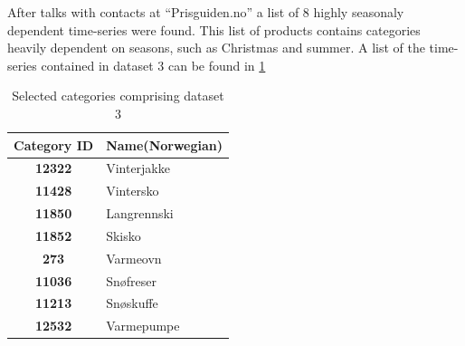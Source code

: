 After talks with contacts at ``Prisguiden.no'' a list of 8 highly seasonaly dependent time-series were found.
This list of products contains categories heavily dependent on seasons, such as Christmas and summer.
A list of the time-series contained in dataset 3 can be found in \cref{table:dataset3}


\begin{table}[H]
  \centering
  \caption{Selected categories comprising dataset 3}
  \label{table:dataset3}
  \begin{tabular}{|c|l|}\hline
    Category ID & Name(Norwegian)  \\ \hline
    \textbf{12322  } & Vinterjakke      \\ \hline
    \textbf{11428  } & Vintersko      \\ \hline
    \textbf{11850  } & Langrennski      \\ \hline
    \textbf{11852  } & Skisko     \\ \hline
    \textbf{273    } & Varmeovn     \\ \hline
    \textbf{11036  } & Snøfreser     \\ \hline
    \textbf{11213  } & Snøskuffe     \\ \hline
    \textbf{12532  } & Varmepumpe     \\ \hline
  \end{tabular}
\end{table}


